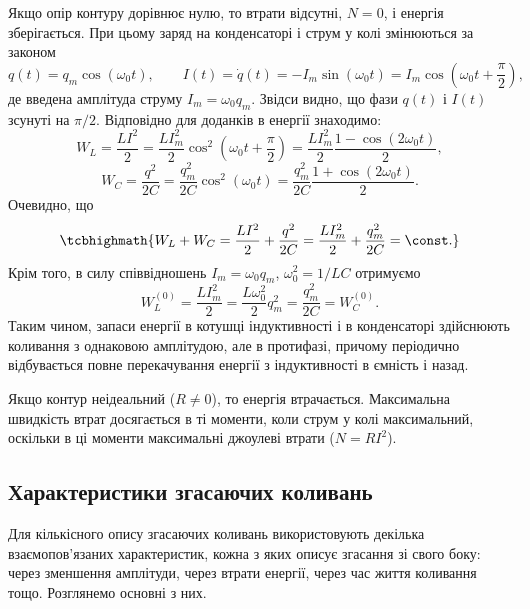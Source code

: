 Якщо опір контуру дорівнює нулю, то втрати відсутні,
$N = 0$, і енергія зберігається. При цьому заряд на конденсаторі і струм у
колі змінюються за законом
\begin{equation}\label{eq:lossless_oscillations}
	q(t) = q_m \cos(\omega_0 t), \qquad
	I(t) = \dot{q}(t) = -I_m \sin(\omega_0 t) = I_m \cos\left(\omega_0 t + \frac{\pi}{2}\right),
\end{equation}
де введена амплітуда струму $I_m = \omega_0 q_m$. Звідси видно, що фази $q(t)$ і
$I(t)$ зсунуті на $\pi/2$. Відповідно для доданків в енергії знаходимо:
\begin{equation}\label{eq:WL_WC_oscillations}
	W_L = \frac{LI^2}{2} = \frac{LI_m^2}{2} \cos^2\left(\omega_0 t + \frac{\pi}{2}\right) = \frac{LI_m^2}{2} \frac{1 - \cos(2\omega_0 t)}{2},
\end{equation}
\begin{equation}\label{eq:WC_oscillations}
	W_C = \frac{q^2}{2C} = \frac{q_m^2}{2C} \cos^2(\omega_0 t) = \frac{q_m^2}{2C} \frac{1 + \cos(2\omega_0 t)}{2}.
\end{equation}
Очевидно, що
\begin{equation}\label{eq:energy_conservation}
	\tcbhighmath{
		W_L + W_C = \frac{LI^2}{2} + \frac{q^2}{2C} = \frac{LI_m^2}{2} + \frac{q_m^2}{2C} = \const.
	}
\end{equation}
Крім того, в силу співвідношень $I_m = \omega_0 q_m$, $\omega_0^2 = 1/LC$ отримуємо
\begin{equation}\label{eq:energy_amplitudes}
	W_L^{(0)} = \frac{LI_m^2}{2} = \frac{L\omega_0^2}{2} q_m^2 = \frac{q_m^2}{2C} = W_C^{(0)}.
\end{equation}
Таким чином, запаси енергії в котушці індуктивності і в конденсаторі здійснюють коливання з однаковою амплітудою, але в протифазі,
причому періодично відбувається повне перекачування енергії з індуктивності в ємність і назад.

Якщо контур неідеальний ($R \neq 0$), то енергія втрачається. Максимальна швидкість втрат досягається в ті моменти, коли струм у колі
максимальний, оскільки в ці моменти максимальні джоулеві втрати
($N = RI^2$).

\subsection*{Характеристики згасаючих коливань}

Для кількісного опису згасаючих коливань використовують декілька взаємопов'язаних характеристик, кожна з яких описує згасання зі свого боку: через зменшення амплітуди, через втрати енергії, через час життя коливання тощо. Розглянемо основні з них.


